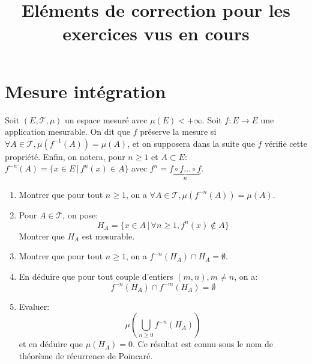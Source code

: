 \documentclass[a4paper, 12pt]{amsart}
\title{Eléments de correction pour les exercices vus en cours}
\begin{document}
\maketitle
\section{Mesure intégration}
\begin{fex}
Soit $(E,\mathcal{T},\mu)$ un espace mesuré avec $\mu(E)<+\infty$.
 Soit $f\colon E \to E$ une application mesurable. 
 On dit que $f$ préserve la mesure si $\forall A \in \mathcal{T},
\mu(f^{-1}(A))=\mu(A)$, et on supposera dans la suite
  que $f$ vérifie cette propriété.
Enfin, on notera, pour $n \geq 1$ et $A \subset E$: $f^{-n}(A)=\{x \in E \, | \,
f^n(x)\in A\}$  
avec $f^n=\underbrace{f \circ f \dots \circ f}_n$.
\begin{enumerate}
\item Montrer que pour tout $n \geq 1$, on a $\forall A \in  \mathcal{T},
\mu(f^{-n}(A))=\mu(A)$.
\item Pour $A \in \mathcal{T}$, on pose:
\[
H_A = \{ x \in A \, | \, \forall n \geq 1, f^n(x) \notin A \}
\]
Montrer que $H_A$ est mesurable.
\item Montrer que pour tout $n \geq 1$, on a $f^{-n}(H_A) \cap H_A = \emptyset$.
\item En déduire que pour tout couple d'entiers $(m,n), m \neq n$, on a:
\[
f^{-n}(H_A) \cap f^{-m}(H_A)= \emptyset
\]
\item Evaluer:
\[
\mu \left( \bigcup_{n \geq 0} f^{-n}(H_A) \right)
\]
et en déduire que $\mu(H_A)=0$. Ce résultat est connu sous le nom de théorème de
récurrence de Poincaré.
\end{enumerate}
\end{fex}
\end{document}
